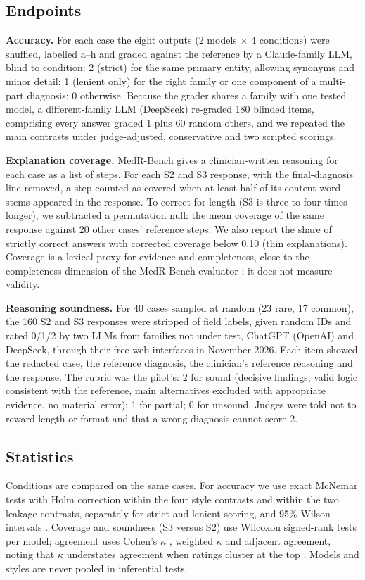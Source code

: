 \IfFileExists{IEEEtran.cls}{\ieeetrue\documentclass[conference]{IEEEtran}}{\ieeefalse\documentclass[10pt,twocolumn,letterpaper]{article}}
\begin{document}
\subsection{Endpoints}
\textbf{Accuracy.} For each case the eight outputs (2 models $\times$ 4 conditions) were shuffled, labelled a--h and graded against the reference by a Claude-family LLM, blind to condition: 2 (strict) for the same primary entity, allowing synonyms and minor detail; 1 (lenient only) for the right family or one component of a multi-part diagnosis; 0 otherwise. Because the grader shares a family with one tested model, a different-family LLM (DeepSeek) re-graded 180 blinded items, comprising every answer graded 1 plus 60 random others, and we repeated the main contrasts under judge-adjusted, conservative and two scripted scorings.

\textbf{Explanation coverage.} MedR-Bench gives a clinician-written reasoning for each case as a list of steps. For each S2 and S3 response, with the final-diagnosis line removed, a step counted as covered when at least half of its content-word stems appeared in the response. To correct for length (S3 is three to four times longer), we subtracted a permutation null: the mean coverage of the same response against 20 other cases' reference steps. We also report the share of strictly correct answers with corrected coverage below 0.10 (thin explanations). Coverage is a lexical proxy for evidence and completeness, close to the completeness dimension of the MedR-Bench evaluator \cite{qiu2025}; it does not measure validity.

\textbf{Reasoning soundness.} For 40 cases sampled at random (23 rare, 17 common), the 160 S2 and S3 responses were stripped of field labels, given random IDs and rated 0/1/2 by two LLMs from families not under test, ChatGPT (OpenAI) and DeepSeek, through their free web interfaces in November 2026. Each item showed the redacted case, the reference diagnosis, the clinician's reference reasoning and the response. The rubric was the pilot's: 2 for sound (decisive findings, valid logic consistent with the reference, main alternatives excluded with appropriate evidence, no material error); 1 for partial; 0 for unsound. Judges were told not to reward length or format and that a wrong diagnosis cannot score 2. %

\subsection{Statistics}
Conditions are compared on the same cases. For accuracy we use exact McNemar tests \cite{mcnemar1947} with Holm correction \cite{holm1979} within the four style contrasts and within the two leakage contrasts, separately for strict and lenient scoring, and 95\% Wilson intervals \cite{wilson1927}. Coverage and soundness (S3 versus S2) use Wilcoxon signed-rank tests per model; agreement uses Cohen's $\kappa$ \cite{cohen1960}, weighted $\kappa$ and adjacent agreement, noting that $\kappa$ understates agreement when ratings cluster at the top \cite{liu2026}. Models and styles are never pooled in inferential tests.
\end{document}
